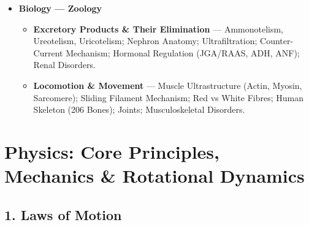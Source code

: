 \documentclass[11pt,a4paper]{article}
\begin{document}
\begin{tcolorbox}[enhanced,colback=white,colframe=primaryteal,arc=2mm,boxrule=1pt]
\begin{itemize}[leftmargin=1.5em, itemsep=3pt]
  \item \textbf{\color{primaryteal}Biology --- Zoology}
  \begin{itemize}[label=$\circ$, itemsep=1pt]
    \item \textbf{Excretory Products \& Their Elimination} --- Ammonotelism, Ureotelism, Uricotelism; Nephron Anatomy; Ultrafiltration; Counter-Current Mechanism; Hormonal Regulation (JGA/RAAS, ADH, ANF); Renal Disorders.
    \item \textbf{Locomotion \& Movement} --- Muscle Ultrastructure (Actin, Myosin, Sarcomere); Sliding Filament Mechanism; Red vs White Fibres; Human Skeleton (206 Bones); Joints; Musculoskeletal Disorders.
  \end{itemize}
\end{itemize}
\end{tcolorbox}

\vspace{10pt}

\section{Physics: Core Principles, Mechanics \& Rotational Dynamics}

\subsection{1. Laws of Motion}
\end{document}
